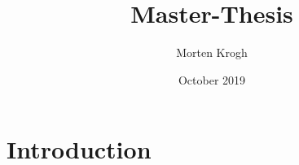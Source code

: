 \documentclass{article}
\title{Master-Thesis}
\author{Morten Krogh}
\date{October 2019}
\begin{document}
\maketitle

\section{Introduction}
\end{document}

